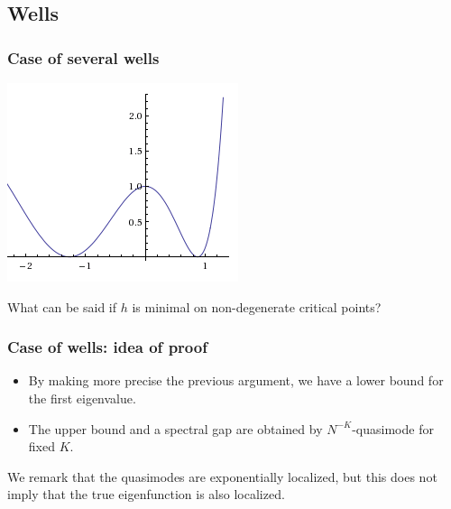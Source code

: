 \documentclass[mathserif]{beamer}
\begin{document}
\subsection{Wells}
\begin{frame}
  \frametitle{Case of several wells}
  \begin{minipage}[l]{0.3\linewidth}
    \includegraphics[width=\linewidth]{wells.png}
  \end{minipage}
  \begin{minipage}[r]{0.65\linewidth}
    What can be said if $h$ is minimal on non-degenerate critical
    points?
    

  \end{minipage}
\end{frame}

\begin{frame}
  \frametitle{Case of wells: idea of proof}
  \begin{itemize}
  \item By making more precise the previous argument, we have a lower
    bound for the first eigenvalue.
  \item The upper bound and a spectral gap are obtained by
    $N^{-K}$-quasimode for fixed $K$.
  \end{itemize}

We remark that the quasimodes are exponentially localized, but this
does not imply that the true eigenfunction is also localized.
\end{frame}
\end{document}
